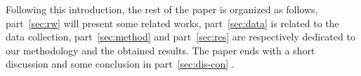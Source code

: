 Following this introduction, the rest of the paper is organized as follows, part~\ref{sec:rw} will present some related works, part~\ref{sec:data} is related to the data collection, part~\ref{sec:method} and part~\ref{sec:res} are respectively dedicated to our methodology and the obtained results.
The paper ends with a short discussion and some conclusion in part~\ref{sec:dis-con} .




